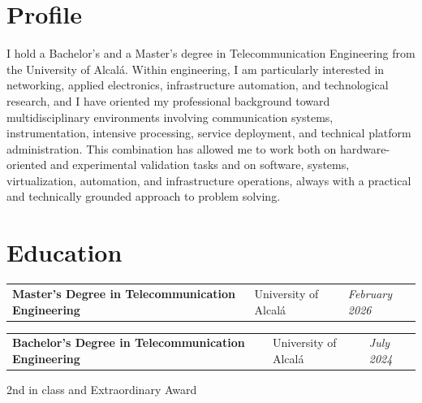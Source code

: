 \section{Profile}
\begin{onecolentry}
	I hold a Bachelor's and a Master's degree in Telecommunication Engineering from the University of Alcalá. Within engineering, I am particularly interested in networking, applied electronics, infrastructure automation, and technological research, and I have oriented my professional background toward multidisciplinary environments involving communication systems, instrumentation, intensive processing, service deployment, and technical platform administration. This combination has allowed me to work both on hardware-oriented and experimental validation tasks and on software, systems, virtualization, automation, and infrastructure operations, always with a practical and technically grounded approach to problem solving.
\end{onecolentry}

\vspace{-5pt}

\section{Education}

\begin{onecolentry}
	\begin{tabularx}{\textwidth}{@{}>{\raggedright\arraybackslash}X>{\raggedright\arraybackslash}p{3.6cm}>{\raggedleft\arraybackslash}p{2.4cm}@{}}
		\textbf{Master's Degree in Telecommunication Engineering} & University of Alcalá & \textit{February 2026}
	\end{tabularx}
\end{onecolentry}

\vspace{0.2 cm}

\begin{onecolentry}
	\begin{tabularx}{\textwidth}{@{}>{\raggedright\arraybackslash}X>{\raggedright\arraybackslash}p{3.6cm}>{\raggedleft\arraybackslash}p{2.4cm}@{}}
		\textbf{Bachelor's Degree in Telecommunication Engineering} & University of Alcalá & \textit{July 2024}
	\end{tabularx}
	
	\vspace{0.05 cm}
	\hspace{0.2cm}2nd in class and Extraordinary Award
\end{onecolentry}

